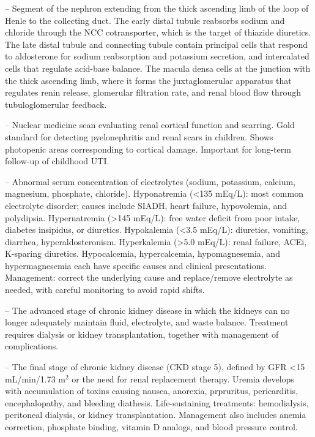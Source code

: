 -- Segment of the nephron extending from the thick ascending limb of the loop of Henle to the collecting duct. The early distal tubule reabsorbs sodium and chloride through the NCC cotransporter, which is the target of thiazide diuretics. The late distal tubule and connecting tubule contain principal cells that respond to aldosterone for sodium reabsorption and potassium secretion, and intercalated cells that regulate acid-base balance. The macula densa cells at the junction with the thick ascending limb, where it forms the juxtaglomerular apparatus that regulates renin release, glomerular filtration rate, and renal blood flow through tubuloglomerular feedback.

-- Nuclear medicine scan evaluating renal cortical function and scarring. Gold standard for detecting pyelonephritis and renal scars in children. Shows photopenic areas corresponding to cortical damage. Important for long-term follow-up of childhood UTI.

-- Abnormal serum concentration of electrolytes (sodium, potassium, calcium, magnesium, phosphate, chloride). Hyponatremia (<135 mEq/L): most common electrolyte disorder; causes include SIADH, heart failure, hypovolemia, and polydipsia. Hypernatremia (>145 mEq/L): free water deficit from poor intake, diabetes insipidus, or diuretics. Hypokalemia (<3.5 mEq/L): diuretics, vomiting, diarrhea, hyperaldosteronism. Hyperkalemia (>5.0 mEq/L): renal failure, ACEi, K-sparing diuretics. Hypocalcemia, hypercalcemia, hypomagnesemia, and hypermagnesemia each have specific causes and clinical presentations. Management: correct the underlying cause and replace/remove electrolyte as needed, with careful monitoring to avoid rapid shifts.

-- The advanced stage of chronic kidney disease in which the kidneys can no longer adequately maintain fluid, electrolyte, and waste balance. Treatment requires dialysis or kidney transplantation, together with management of complications.

-- The final stage of chronic kidney disease (CKD stage 5), defined by GFR <15 mL/min/1.73 m$^2$ or the need for renal replacement therapy. Uremia develops with accumulation of toxins causing nausea, anorexia, prpruritus, pericarditis, encephalopathy, and bleeding diathesis. Life-sustaining treatments: hemodialysis, peritoneal dialysis, or kidney transplantation. Management also includes anemia correction, phosphate binding, vitamin D analogs, and blood pressure control.

